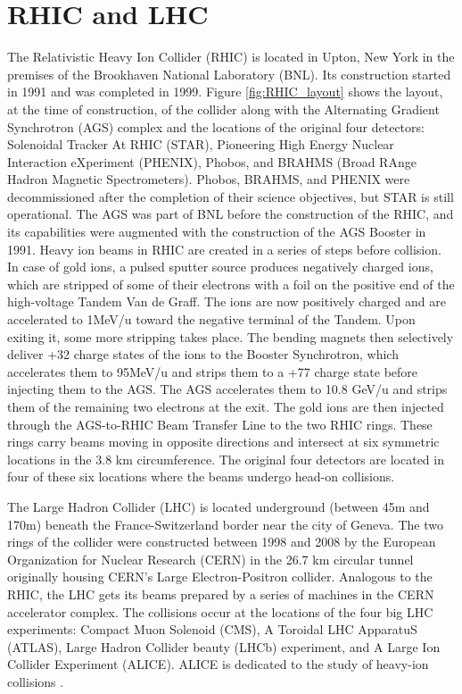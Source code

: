 \section{RHIC and LHC}
The Relativistic Heavy Ion Collider (RHIC) is located in Upton, New York in the premises of the Brookhaven National Laboratory (BNL). Its construction started in 1991 and was completed in 1999. Figure \ref{fig:RHIC_layout} shows the layout, at the time of construction, of the collider along with the Alternating Gradient Synchrotron (AGS) complex and the locations of the original four detectors: Solenoidal Tracker At RHIC (STAR), Pioneering High Energy Nuclear Interaction eXperiment (PHENIX), Phobos, and BRAHMS (Broad RAnge Hadron Magnetic Spectrometers). Phobos, BRAHMS, and PHENIX were decommissioned after the completion of their science objectives, but STAR is still operational. The AGS was part of BNL before the construction of the RHIC, and its capabilities were augmented with the construction of the AGS Booster in 1991.
Heavy ion beams in RHIC are created in a series of steps before collision. In case of gold ions, a pulsed sputter source produces negatively charged ions, which are stripped of some of their electrons with a foil on the positive end of the high-voltage Tandem Van de Graff. The ions are now positively charged and are accelerated to 1MeV/u toward the negative terminal of the Tandem. Upon exiting it, some more stripping takes place. The bending magnets then selectively deliver +32 charge states of the ions to the Booster Synchrotron, which accelerates them to 95MeV/u and strips them to a +77 charge state before injecting them to the AGS. The AGS accelerates them to 10.8 GeV/u and strips them of the remaining two electrons at the exit. The gold ions are then injected through the AGS-to-RHIC Beam Transfer Line to the two RHIC rings. These rings carry beams moving in opposite directions and intersect at six symmetric locations in the 3.8 km circumference. The original four detectors are located in four of these six locations where the beams undergo head-on collisions.

The Large Hadron Collider (LHC) is located underground (between 45m and 170m) beneath the France-Switzerland border near the city of  Geneva. The two rings of the collider were constructed between 1998 and 2008 by the European Organization for Nuclear Research (CERN) in the 26.7 km circular tunnel originally housing CERN's Large Electron-Positron collider. Analogous to the RHIC, the LHC gets its beams prepared by a series of machines in the CERN accelerator complex. The collisions occur at the locations of the four big LHC experiments: Compact Muon Solenoid (CMS), A Toroidal LHC ApparatuS (ATLAS), Large Hadron Collider beauty (LHCb) experiment, and A Large Ion Collider Experiment (ALICE). ALICE is dedicated to the study of heavy-ion collisions \cite{1748-0221-3-08-S08001}.

